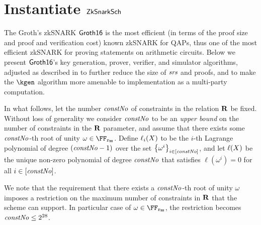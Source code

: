 
\section{Instantiate $\mathsf{ZkSnarkSch}$}\label{instantiation:zksnark}

The Groth's zkSNARK $\mathsf{Groth16}$ \cite{groth2016size} is the most efficient (in terms of the proof size and proof and verification cost) known zkSNARK for QAPs, thus one of the most efficient zkSNARK for proving statements on arithmetic circuits. Below we present $\mathsf{Groth16}$'s key generation, prover, verifier, and simulator algorithms, adjusted as described in \cite{bowe2017mpc} to further reduce the size of $\mathit{srs}$ and proofs, and to make the $\kgen$ algorithm more amenable to implementation as a multi-party computation.

In what follows, let the number $\mathit{constNo}$ of constraints in the relation $\mathbf{R}$ be fixed. Without loss of generality we consider $\mathit{constNo}$ to be an \emph{upper bound} on the number of constraints in the $\mathbf{R}$ parameter, and assume that there exists some $\mathit{constNo}$-th root of unity $\omega \in \FFx{\rBN}$. Define $\ell_i(X)$ to be the $i$-th Lagrange polynomial of degree $(\mathit{constNo} - 1)$ over the set $\left\{{\omega^i}\right\}_{i \in [\mathit{constNo}]}$, and let $\ell(X)$ be the unique non-zero polynomial of degree $\mathit{constNo}$ that satisfies $\ell(\omega^i) = 0$ for all $i \in [\mathit{constNo}]$.

We note that the requirement that there exists a $\mathit{constNo}$-th root of unity $\omega$ imposes a restriction on the maximum number of constraints in $\mathbf{R}$ that the scheme can support. In particular case of $\omega \in \FFx{\rBN}$, the restriction becomes $\mathit{constNo} \leq 2^{28}$.


